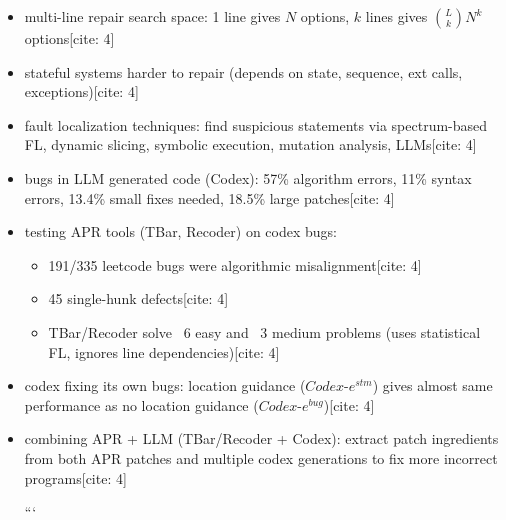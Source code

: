 \documentclass[11pt]{book}
\begin{document}
\begin{itemize}
\item multi-line repair search space: 1 line gives $N$ options, $k$ lines gives $\binom{L}{k}N^k$ options[cite: 4]

\item stateful systems harder to repair (depends on state, sequence, ext calls, exceptions)[cite: 4]

\item fault localization techniques: find suspicious statements via spectrum-based FL, dynamic slicing, symbolic execution, mutation analysis, LLMs[cite: 4]

\item bugs in LLM generated code (Codex): 57\% algorithm errors, 11\% syntax errors, 13.4\% small fixes needed, 18.5\% large patches[cite: 4]

\item testing APR tools (TBar, Recoder) on codex bugs:
\begin{itemize}
    \item 191/335 leetcode bugs were algorithmic misalignment[cite: 4]
    \item 45 single-hunk defects[cite: 4]
    \item TBar/Recoder solve ~6 easy and ~3 medium problems (uses statistical FL, ignores line dependencies)[cite: 4]
\end{itemize}

\item codex fixing its own bugs: location guidance ($Codex\text{-}e^{stm}$) gives almost same performance as no location guidance ($Codex\text{-}e^{bug}$)[cite: 4]

\item combining APR + LLM (TBar/Recoder + Codex): extract patch ingredients from both APR patches and multiple codex generations to fix more incorrect programs[cite: 4]

```

\end{itemize}
\end{document}
